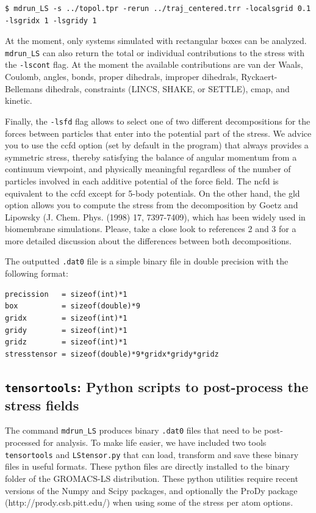 \documentclass[10pt,letterpaper,notitlepage]{article}
\begin{document}
\begin{lstlisting}[caption=Setting the grid size]
$ mdrun_LS -s ../topol.tpr -rerun ../traj_centered.trr -localsgrid 0.1 -lsgridx 1 -lsgridy 1
\end{lstlisting}
At the moment, only systems simulated with rectangular boxes can be analyzed. \texttt{mdrun\_LS} can also return the total or individual contributions to the stress with the \texttt{-lscont} flag. At the moment the available contributions are van der Waals, Coulomb, angles, bonds, proper dihedrals, improper dihedrals, Ryckaert-Bellemans dihedrals, constraints (LINCS, SHAKE, or SETTLE), cmap, and kinetic. 

Finally, the \texttt{-lsfd} flag allows to select one of two different decompositions for the forces between particles that enter into the potential part of the stress. We advice you to use the ccfd option (set by default in the program) that always provides a symmetric stress, thereby satisfying the balance of angular momentum from a continuum viewpoint, and physically meaningful regardless of the number of particles involved in each additive potential of the force field. The ncfd is equivalent to the ccfd except for 5-body potentials. On the other hand, the gld option allows you to compute the stress from the decomposition by Goetz and Lipowsky (J. Chem. Phys. (1998) 17, 7397-7409), which has been widely used in biomembrane simulations. Please, take a close look to references 2 and 3 for a more detailed discussion about the differences between both decompositions.


The outputted \texttt{.dat0} file is a simple binary file in double precision with the following format:
\begin{lstlisting}[caption=Format of the \texttt{.dat0} binary file]
precission   = sizeof(int)*1
box          = sizeof(double)*9
gridx        = sizeof(int)*1
gridy        = sizeof(int)*1
gridz        = sizeof(int)*1
stresstensor = sizeof(double)*9*gridx*gridy*gridz
\end{lstlisting}

\subsection{\texttt{tensortools}: Python scripts to post-process the stress fields \label{postprocess}}

The command \texttt{mdrun\_LS} produces binary \texttt{.dat0} files that need to be post-processed for analysis. To make life easier, we have included two tools \texttt{tensortools} and \texttt{LStensor.py} that can load, transform and save these binary files in useful formats. These python files are directly installed to the binary folder of the GROMACS-LS distribution. These python utilities require recent versions of the Numpy and Scipy packages, and optionally the ProDy package (http://prody.csb.pitt.edu/) when using some of the stress per atom options.
\end{document}
